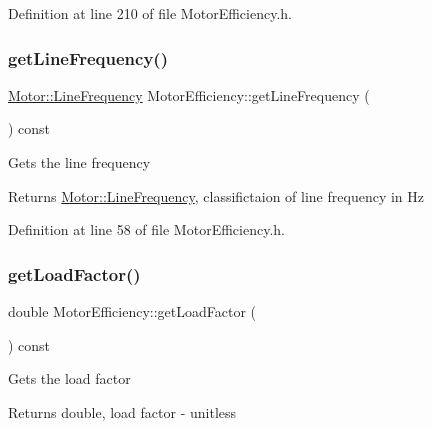 Definition at line 210 of file Motor\+Efficiency.\+h.

\mbox{\label{class_motor_efficiency_a3cc0ed606154a04d035399e05d1cb02a}} 
\subsubsection{\texorpdfstring{get\+Line\+Frequency()}{getLineFrequency()}}
{\footnotesize\ttfamily \hyperlink{class_motor_acee1bdf1b684ad36cb80dc2829d9fcee}{Motor\+::\+Line\+Frequency} Motor\+Efficiency\+::get\+Line\+Frequency (\begin{DoxyParamCaption}{ }\end{DoxyParamCaption}) const\hspace{0.3cm}{\ttfamily [inline]}}

Gets the line frequency

\begin{DoxyReturn}{Returns}
\hyperlink{class_motor_acee1bdf1b684ad36cb80dc2829d9fcee}{Motor\+::\+Line\+Frequency}, classifictaion of line frequency in Hz 
\end{DoxyReturn}


Definition at line 58 of file Motor\+Efficiency.\+h.

\mbox{\label{class_motor_efficiency_abff38d95856c3d33c9c48c45e77e8899}} 
\subsubsection{\texorpdfstring{get\+Load\+Factor()}{getLoadFactor()}}
{\footnotesize\ttfamily double Motor\+Efficiency\+::get\+Load\+Factor (\begin{DoxyParamCaption}{ }\end{DoxyParamCaption}) const\hspace{0.3cm}{\ttfamily [inline]}}

Gets the load factor

\begin{DoxyReturn}{Returns}
double, load factor -\/ unitless 
\end{DoxyReturn}


